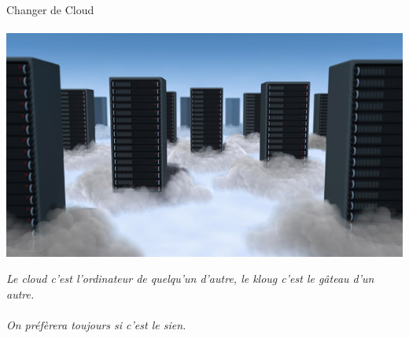 \documentclass{beamer}
\begin{document}
\begin{frame}
\begin{center}
\Huge{Changer de Cloud}
\\~\\
\includegraphics[scale=0.35] {./images/cloud_data_center.jpg}
\end{center}
\end{frame}

\begin{frame}
\begin{center}
\huge{\emph{Le cloud c'est l'ordinateur de quelqu'un d'autre, le kloug c'est le gâteau d'un autre. \\~\\On préfèrera toujours si c'est le sien.}}
\end{center}
\end{frame}
\end{document}
